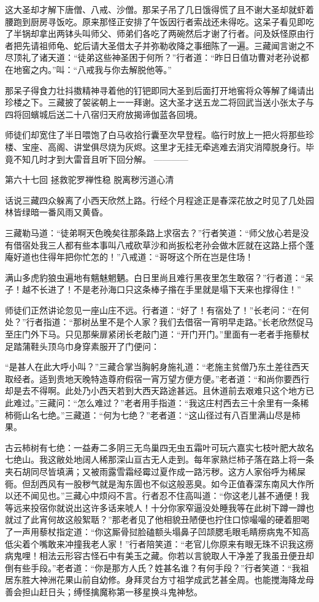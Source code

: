 \documentclass[12pt,UTF8]{ctexbook}
\begin{document}
这大圣却才解下唐僧、八戒、沙僧。那呆子吊了几日饿得慌了且不谢大圣却就虾着腰跑到厨房寻饭吃。原来那怪正安排了午饭因行者索战还未得吃。这呆子看见即吃了半锅却拿出两钵头叫师父、师弟们各吃了两碗然后才谢了行者。问及妖怪原由行者把先请祖师龟、蛇后请大圣借太子并弥勒收降之事细陈了一遍。三藏闻言谢之不尽顶礼了诸天道：“徒弟这些神圣困于何所？”行者道：“昨日日值功曹对老孙说都在地窖之内。”叫：“八戒我与你去解脱他等。”

那呆子得食力壮抖擞精神寻着他的钉钯即同大圣到后面打开地窖将众等解了绳请出珍楼之下。三藏披了袈裟朝上一一拜谢。这大圣才送五龙二将回武当送小张太子与四将回蠙城后送二十八宿归天府放揭谛伽蓝各回境。

师徒们却宽住了半日喂饱了白马收拾行囊至次早登程。临行时放上一把火将那些珍楼、宝座、高阁、讲堂俱尽烧为灰烬。这里才无挂无牵逃难去消灾消障脱身行。毕竟不知几时才到大雷音且听下回分解。
------------

第六十七回 拯救驼罗禅性稳 脱离秽污道心清

话说三藏四众躲离了小西天欣然上路。行经个月程途正是春深花放之时见了几处园林皆绿暗一番风雨又黄昏。

三藏勒马道：“徒弟啊天色晚矣往那条路上求宿去？”行者笑道：“师父放心若是没有借宿处我三人都有些本事叫八戒砍草沙和尚扳松老孙会做木匠就在这路上搭个蓬庵好道也住得年把你忙怎的！”八戒道：“哥呀这个所在岂是住场！

满山多虎豹狼虫遍地有魑魅魍魉。白日里尚且难行黑夜里怎生敢宿？”行者道：“呆子！越不长进了！不是老孙海口只这条棒子揝在手里就是塌下天来也撑得住！”

师徒们正然讲论忽见一座山庄不远。行者道：“好了！有宿处了！”长老问：“在何处？”行者指道：“那树丛里不是个人家？我们去借宿一宵明早走路。”长老欣然促马至庄门外下马。只见那柴扉紧闭长老敲门道：“开门开门。”里面有一老者手拖藜杖足踏蒲鞋头顶乌巾身穿素服开了门便问：

“是甚人在此大呼小叫？”三藏合掌当胸躬身施礼道：“老施主贫僧乃东土差往西天取经者。适到贵地天晚特造尊府假宿一宵万望方便方便。”老者道：“和尚你要西行却是去不得啊。此处乃小西天若到大西天路途甚远。且休道前去艰难只这个地方已此难过。”三藏问：“怎么难过？”老者用手指道：“我这庄村西去三十余里有一条稀柿衕山名七绝。”三藏道：“何为七绝？”老者道：“这山径过有八百里满山尽是柿果。

古云柿树有七绝：一益寿二多阴三无鸟巢四无虫五霜叶可玩六嘉实七枝叶肥大故名七绝山。我这敝处地阔人稀那深山亘古无人走到。每年家熟烂柿子落在路上将一条夹石胡同尽皆填满；又被雨露雪霜经霉过夏作成一路污秽。这方人家俗呼为稀屎衕。但刮西风有一股秽气就是淘东圊也不似这般恶臭。如今正值春深东南风大作所以还不闻见也。”三藏心中烦闷不言。行者忍不住高叫道：“你这老儿甚不通便！我等远来投宿你就说出这许多话来唬人！十分你家窄逼没处睡我等在此树下蹲一蹲也就过了此宵何故这般絮聒？”那老者见了他相貌丑陋便也拧住口惊嘬嘬的硬着胆喝了一声用藜杖指定道：“你这厮骨挝脸磕额头塌鼻子凹颉腮毛眼毛睛痨病鬼不知高低尖着个嘴敢来冲撞我老人家！”行者陪笑道：“老官儿你原来有眼无珠不识我这痨病鬼哩！相法云形容古怪石中有美玉之藏。你若以言貌取人干净差了我虽丑便丑却倒有些手段。”老者道：“你是那方人氏？姓甚名谁？有何手段？”行者笑道：“我祖居东胜大神洲花果山前自幼修。身拜灵台方寸祖学成武艺甚全周。也能搅海降龙母善会担山赶日头；缚怪擒魔称第一移星换斗鬼神愁。
\end{document}
